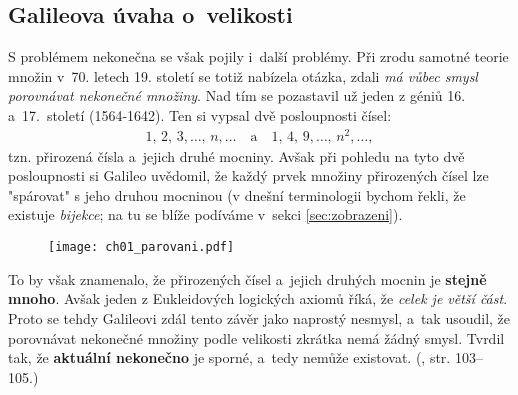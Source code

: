 \subsection{Galileova úvaha o~velikosti}\label{subsec:galileo}
S problémem nekonečna se však pojily i~další problémy. Při zrodu samotné teorie množin v~70. letech 19. století se totiž nabízela otázka, zdali \emph{má vůbec smysl porovnávat nekonečné množiny}. Nad tím se pozastavil už jeden z géniů 16. a~17.~století  \mbox{(1564-1642)}. Ten si vypsal dvě posloupnosti čísel:
\begin{align*}
1,\,2,\,3,\dots,\,n,\dots \quad \text{a} \quad 1,\,4,\,9,\dots,\,n^2,\dots ,
\end{align*}
tzn. přirozená čísla a~jejich druhé mocniny. Avšak při pohledu na tyto dvě posloupnosti si Galileo uvědomil, že každý prvek množiny přirozených čísel lze "spárovat" s jeho druhou mocninou (v dnešní terminologii bychom řekli, že existuje \emph{bijekce}; na tu se blíže podíváme v~sekci \ref{sec:zobrazeni}).
\begin{figure}[H]
	\centering
	\texttt{[image: ch01\_parovani.pdf]}
\end{figure}
To by však znamenalo, že přirozených čísel a~jejich druhých mocnin je \textbf{stejně mnoho}. Avšak jeden z Eukleidových logických axiomů říká, že \emph{celek je větší část}. Proto se tehdy Galileovi zdál tento závěr jako naprostý nesmysl, a~tak usoudil, že porovnávat nekonečné množiny podle velikosti zkrátka nemá žádný smysl. Tvrdil tak, že \textbf{aktuální nekonečno} je sporné, a~tedy nemůže existovat. (\cite{Fuchs2003}, str. 103--105.)

